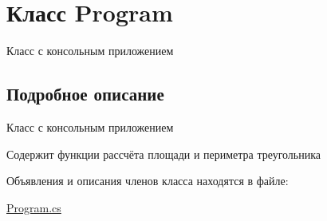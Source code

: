 \hypertarget{class_program}{\section{Класс Program}
\label{class_program}
}


Класс с консольным приложением  




\subsection{Подробное описание}
Класс с консольным приложением 

Содержит функции рассчёта площади и периметра треугольника 

Объявления и описания членов класса находятся в файле\+:\begin{DoxyCompactItemize}
\item 
\hyperlink{_program_8cs}{Program.\+cs}\end{DoxyCompactItemize}
